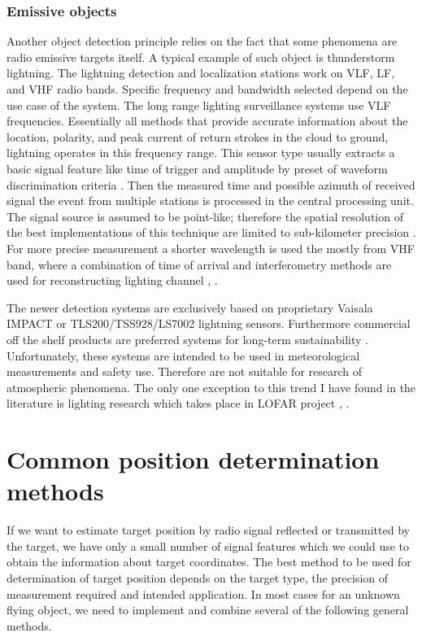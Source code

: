 \documentclass[twoside]{ctuthesis}
\theoremstyle{plain}
\theoremstyle{definition}
\theoremstyle{note}
\begin{document}
\subsubsection{Emissive objects}

Another object detection principle relies on the fact that some phenomena are radio emissive targets itself. A typical example of such object is thunderstorm lightning. The lightning detection and localization stations work on VLF, LF, and VHF radio bands. Specific frequency and bandwidth selected depend on the use case of the system. The long range lighting surveillance systems use VLF frequencies. Essentially all methods that provide accurate information about the location,  polarity,  and peak current of return strokes
in the cloud to ground, lightning operates in this frequency range. This sensor type usually extracts a basic signal feature like time of trigger and amplitude by preset of waveform discrimination criteria \cite{VLF_TOGA}. Then the measured time and possible azimuth of received signal the event from multiple stations is processed in the central processing unit. The signal source is assumed to be point-like; therefore the spatial resolution of the best implementations of this technique are limited to sub-kilometer precision \cite{Lighting_locating}. 
For more precise measurement a shorter wavelength is used the mostly from VHF band, where a combination of time of arrival and interferometry methods are used for reconstructing lighting channel \cite{NALMA_algorithms}, \cite{rocket_triggered} . 

The newer detection systems are exclusively based on proprietary Vaisala  IMPACT \cite{IMPACT_sensor} or TLS200/TSS928/LS7002 lightning sensors. 
Furthermore commercial off the shelf products are preferred systems for long-term sustainability \cite{4DLSS}. Unfortunately, these systems are intended to be used in meteorological measurements and safety use. Therefore are not suitable for research of atmospheric phenomena. The only one exception to this trend I have found in the literature is lighting research which takes place in LOFAR project \cite{LOFAR_lightning}, \cite{LOFAR_lightning2}.  

\section{Common position determination methods}

If we want to estimate target position by radio signal reflected or transmitted by the target, we have only a small number of signal features which we could use to obtain the information about target coordinates. The best method to be used for determination of target position depends on the target type, the precision of measurement required and intended application. In most cases for an unknown flying object, we need to implement and combine several of the following general methods. 
\end{document}
